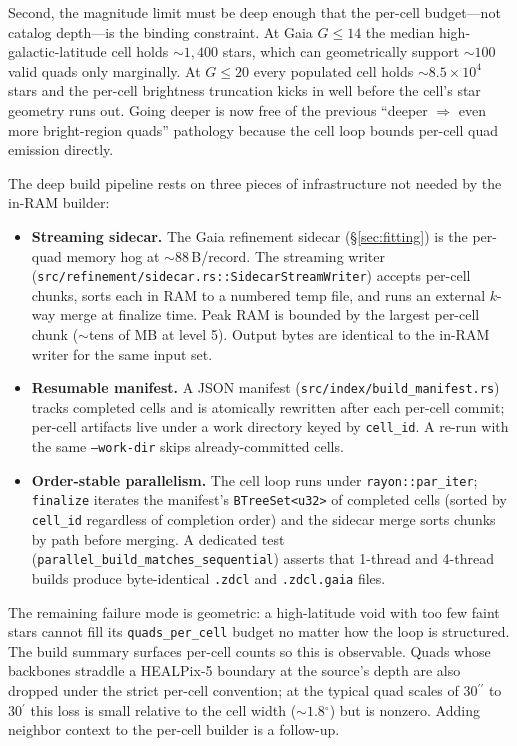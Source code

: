 \documentclass[twocolumn, 10pt]{article}
\newcommand{\arcsec}{\ensuremath{^{\prime\prime}}}
\newcommand{\arcmin}{\ensuremath{^{\prime}}}
\newcommand{\degr}{\ensuremath{^{\circ}}}
\begin{document}
Second, the magnitude limit must be deep enough that the per-cell
budget---not catalog depth---is the binding constraint. At Gaia $G \le
14$ the median high-galactic-latitude cell holds $\sim 1{,}400$ stars,
which can geometrically support $\sim 100$ valid quads only marginally.
At $G \le 20$ every populated cell holds $\sim 8.5 \times 10^4$ stars
and the per-cell brightness truncation kicks in well before the cell's
star geometry runs out. Going deeper is now free of the previous
``deeper $\Rightarrow$ even more bright-region quads'' pathology because
the cell loop bounds per-cell quad emission directly.

The deep build pipeline rests on three pieces of infrastructure not
needed by the in-RAM builder:

\begin{itemize}
    \item \textbf{Streaming sidecar.} The Gaia refinement sidecar
          (\S\ref{sec:fitting}) is the per-quad memory hog at $\sim
          88$\,B/record. The streaming writer
          (\texttt{src/refinement/sidecar.rs::SidecarStreamWriter})
          accepts per-cell chunks, sorts each in RAM to a numbered
          temp file, and runs an external $k$-way merge at finalize
          time. Peak RAM is bounded by the largest per-cell chunk
          ($\sim$tens of MB at level 5). Output bytes are identical
          to the in-RAM writer for the same input set.
    \item \textbf{Resumable manifest.} A JSON manifest
          (\texttt{src/index/build\_manifest.rs}) tracks completed
          cells and is atomically rewritten after each per-cell commit;
          per-cell artifacts live under a work directory keyed by
          \texttt{cell\_id}. A re-run with the same \texttt{--work-dir}
          skips already-committed cells.
    \item \textbf{Order-stable parallelism.} The cell loop runs under
          \texttt{rayon::par\_iter}; \texttt{finalize} iterates the
          manifest's \texttt{BTreeSet<u32>} of completed cells (sorted
          by \texttt{cell\_id} regardless of completion order) and the
          sidecar merge sorts chunks by path before merging. A
          dedicated test (\texttt{parallel\_build\_matches\_sequential})
          asserts that 1-thread and 4-thread builds produce
          byte-identical \texttt{.zdcl} and \texttt{.zdcl.gaia} files.
\end{itemize}

The remaining failure mode is geometric: a high-latitude void with too
few faint stars cannot fill its \texttt{quads\_per\_cell} budget no
matter how the loop is structured. The build summary surfaces per-cell
counts so this is observable. Quads whose backbones straddle a
HEALPix-5 boundary at the source's depth are also dropped under the
strict per-cell convention; at the typical quad scales of $30\arcsec$
to $30\arcmin$ this loss is small relative to the cell width
($\sim 1.8\degr$) but is nonzero. Adding neighbor context to the
per-cell builder is a follow-up.
\end{document}
